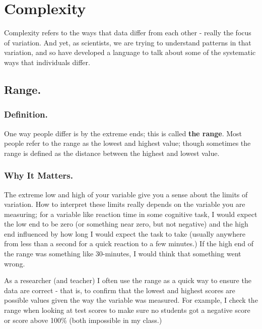 \documentclass[
  letterpaper,
  DIV=11,
  numbers=noendperiod,
  oneside]{scrreprt}
\begin{document}

\section{Complexity}\label{complexity}

Complexity refers to the ways that data differ from each other - really
the focus of variation. And yet, as scientists, we are trying to
understand patterns in that variation, and so have developed a language
to talk about some of the systematic ways that individuals differ.

\subsection{Range.}\label{range.}

\subsubsection{Definition.}\label{definition.-1}

One way people differ is by the extreme ends; this is called \textbf{the
range}. Most people refer to the range as the lowest and highest value;
though sometimes the range is defined as the distance between the
highest and lowest value.

\subsubsection{Why It Matters.}\label{why-it-matters.-1}

The extreme low and high of your variable give you a sense about the
limits of variation. How to interpret these limits really depends on the
variable you are measuring; for a variable like reaction time in some
cognitive task, I would expect the low end to be zero (or something near
zero, but not negative) and the high end influenced by how long I would
expect the task to take (usually anywhere from less than a second for a
quick reaction to a few minutes.) If the high end of the range was
something like 30-minutes, I would think that something went wrong.

As a researcher (and teacher) I often use the range as a quick way to
ensure the data are correct - that is, to confirm that the lowest and
highest scores are possible values given the way the variable was
measured. For example, I check the range when looking at test scores to
make sure no students got a negative score or score above 100\% (both
impossible in my class.)
\end{document}
